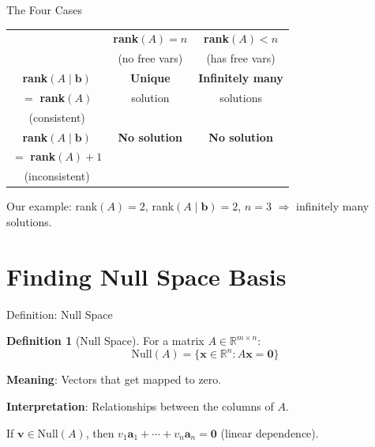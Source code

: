 \documentclass[10pt]{beamer}
\theoremstyle{definition}
\newtheorem{defi}{Definition}[section]
\newcommand{\x}[1]{\alert{\textbf{#1}}}
\begin{document}
\begin{frame}{The Four Cases}

\begin{center}
\begin{tabular}{c|c|c}
& \textbf{rank}$(A) = n$ & \textbf{rank}$(A) < n$ \\
& (no free vars) & (has free vars) \\
\hline
\textbf{rank}$(A \mid \mathbf{b})$ & \x{Unique} & \x{Infinitely many} \\
$= $ \textbf{rank}$(A)$ & solution & solutions \\
(consistent) & & \\
\hline
\textbf{rank}$(A \mid \mathbf{b})$ & \x{No solution} & \x{No solution} \\
$= $ \textbf{rank}$(A) + 1$ & & \\
(inconsistent) & & \\
\end{tabular}
\end{center}

\vspace{1em}

Our example: rank$(A)=2$, rank$(A \mid \mathbf{b})=2$, $n=3$ $\Rightarrow$ infinitely many solutions.

\end{frame}

\section{Finding Null Space Basis}

\begin{frame}{Definition: Null Space}

\begin{defi}[Null Space]
For a matrix $A \in \mathbb{R}^{m \times n}$:
$$\text{Null}(A) = \{\mathbf{x} \in \mathbb{R}^n : A\mathbf{x} = \mathbf{0}\}$$
\end{defi}

\vspace{1em}

\x{Meaning}: Vectors that get mapped to zero.

\vspace{1em}

\x{Interpretation}: Relationships between the columns of $A$.

\vspace{1em}

If $\mathbf{v} \in \text{Null}(A)$, then $v_1 \mathbf{a}_1 + \cdots + v_n \mathbf{a}_n = \mathbf{0}$ (linear dependence).

\end{frame}
\end{document}
